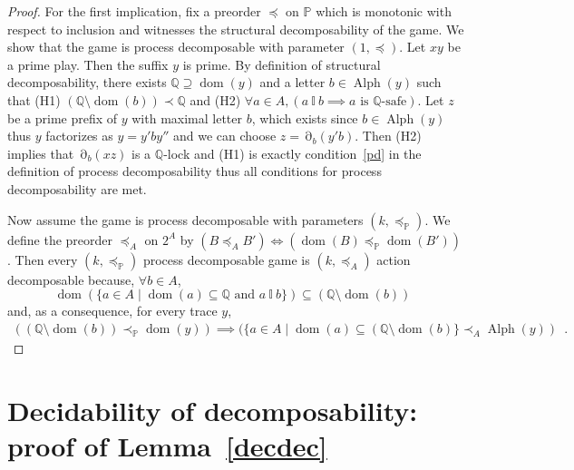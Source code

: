 \documentclass[a4paper,UKenglish]{lipics-v2016}
\newcommand{\PP}{\mathbb{P}}
\newcommand{\QQ}{\mathbb{Q}}
\newcommand{\ind}{~\mathbb{I}~}
\DeclareMathOperator{\dom}{dom}
\DeclareMathOperator{\view}{\partial}
\DeclareMathOperator{\alphabet}{Alph}
\begin{document}
\begin{proof}
For the first implication, 
fix a preorder $\preceq$ on $\PP$ which is monotonic with respect to inclusion
and witnesses the structural decomposability
of the game.
We show that the game is process decomposable
with parameter $(1,\preceq)$.
Let $xy$ be a prime play.
Then the suffix $y$ is prime.
By definition of structural decomposability,
there exists $\QQ \supseteq \dom(y)$
and a letter $b\in\alphabet(y)$ such that
(H1) $(\QQ \setminus \dom(b)) \prec \QQ$
and (H2) $\forall a \in A, (a\ind b \implies a\text{ is $\QQ$-safe})$.
Let $z$ be a prime prefix of $y$ with maximal letter $b$, which exists since $b\in\alphabet(y)$
thus $y$ factorizes as $y=y'by''$ and we can choose $z =\view_b(y'b)$.
Then (H2) implies that $\view_{b}(xz)$ is a  $\QQ$-lock 
and (H1) is exactly condition~\eqref{pd} in the definition of process decomposability
thus all conditions for  process decomposability are met.

Now assume the game is  process decomposable
with parameters $(k,\preceq_\PP)$.
We define the preorder
$\preceq_A$ on $2^A$  by $(B \preceq_A B') \iff (\dom(B)\preceq_\PP \dom(B'))$.
Then every $(k,\preceq_\PP)$ process decomposable game is $(k,\preceq_A)$
action decomposable
because, $\forall b \in A$,
\[
\dom\left(
 \{ a \in A \mid \dom(a) \subseteq \QQ \text{ and $a \ind b$} \}
\right) \subseteq (\QQ \setminus \dom(b))\enspace
\]
and, as a consequence, for every trace $y$,
\begin{multline*}
((\QQ \setminus \dom(b)) \prec_\PP \dom(y))
\implies
( \{ a \in A \mid \dom(a) \subseteq (\QQ \setminus \dom(b) \} \prec_A \alphabet(y))\enspace.
\end{multline*}
\end{proof}


\section{Decidability of decomposability: proof of Lemma~\ref{decdec}}
\end{document}
